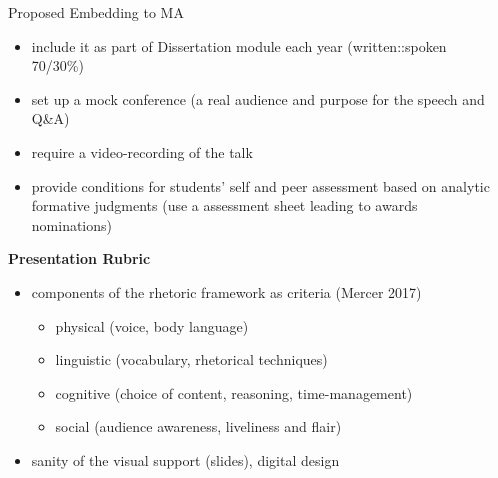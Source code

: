 \documentclass[final]{beamer}
\newlength{\onecolwid}
\newlength{\twocolwid}
\begin{document}
\begin{frame}[t]
\begin{columns}[t]
\begin{column}{\twocolwid}
\begin{columns}[t,totalwidth=\twocolwid]
\begin{column}{\onecolwid}
\end{column} %

\begin{column}{\onecolwid}\vspace{-.6in} %


\begin{block}{Proposed Embedding to MA}

\begin{itemize}
\item include it as part of Dissertation module each year (written::spoken 70/30\%)
\item set up a mock conference (a real audience and purpose for the speech and Q\&A) 
\item require a video-recording of the talk
\item provide conditions for students' self and peer assessment based on analytic formative judgments (use a assessment sheet leading to awards nominations)
\end{itemize}
\textbf{\textcolor{dgreen}{Presentation Rubric}}
\begin{itemize}
	\item components of the rhetoric framework as criteria (Mercer 2017)
	\begin{itemize}
		\item physical (voice, body language)
		\item linguistic (vocabulary, rhetorical techniques)
		\item cognitive (choice of content, reasoning, time-management)
		\item social (audience awareness, liveliness and flair)
	\end{itemize}
	\item sanity of the visual support (slides), digital design
\end{itemize}

\end{block}


\end{column} %

\end{columns} %



\end{column}
\end{columns}
\end{frame}
\end{document}
